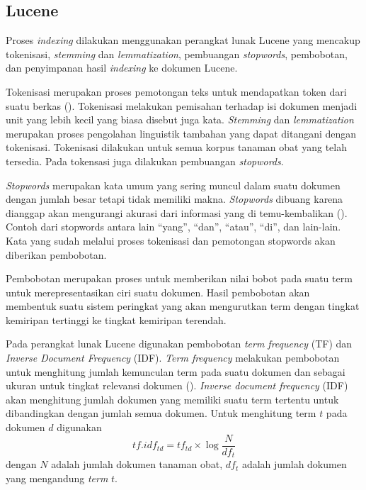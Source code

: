 \subsection*{Lucene}
Proses \textit{indexing} dilakukan menggunakan perangkat lunak Lucene yang mencakup tokenisasi, \textit{stemming} dan \textit{lemmatization}, pembuangan \textit{stopwords}, pembobotan, dan penyimpanan hasil \textit{indexing} ke dokumen Lucene.

Tokenisasi merupakan proses pemotongan teks untuk mendapatkan token dari suatu berkas (\cite{MANNING}). Tokenisasi melakukan pemisahan terhadap isi dokumen menjadi unit yang lebih kecil yang biasa disebut juga kata. \textit{Stemming} dan \textit{lemmatization} merupakan proses pengolahan linguistik tambahan yang dapat ditangani dengan tokenisasi. Tokenisasi dilakukan untuk semua korpus tanaman obat yang telah tersedia. Pada tokensasi juga dilakukan pembuangan \textit{stopwords}.

\textit{Stopwords} merupakan kata umum yang sering muncul dalam suatu dokumen dengan jumlah besar tetapi tidak memiliki makna. \textit{Stopwords} dibuang karena dianggap akan mengurangi akurasi dari informasi yang di temu-kembalikan (\cite{MANNING}). Contoh dari stopwords antara lain “yang”, “dan”, “atau”, “di”, dan lain-lain. Kata yang sudah melalui proses tokenisasi dan pemotongan stopwords akan diberikan pembobotan.

Pembobotan merupakan proses untuk memberikan nilai bobot pada suatu term untuk merepresentasikan ciri suatu dokumen. Hasil pembobotan akan membentuk suatu sistem peringkat yang akan mengurutkan term dengan tingkat kemiripan tertinggi ke tingkat kemiripan terendah.

Pada perangkat lunak Lucene digunakan pembobotan \textit{term frequency} (TF) dan \textit{Inverse Document Frequency} (IDF). \textit{Term frequency} melakukan pembobotan untuk menghitung jumlah kemunculan term pada suatu dokumen dan sebagai ukuran untuk tingkat relevansi dokumen (\cite{MINACK}). \textit{Inverse document frequency} (IDF) akan menghitung jumlah dokumen yang memiliki suatu term tertentu untuk dibandingkan dengan jumlah semua dokumen. Untuk menghitung term $t$ pada dokumen $d$ digunakan 
\begin{equation}
tf.idf_{td}=tf_{td}\times \log \frac{N}{df_t}
\label{eq:tfidf}
\end{equation}
\noindent dengan $N$ adalah jumlah dokumen tanaman obat, $df_t$ adalah jumlah dokumen yang mengandung \textit{term} $t$.

